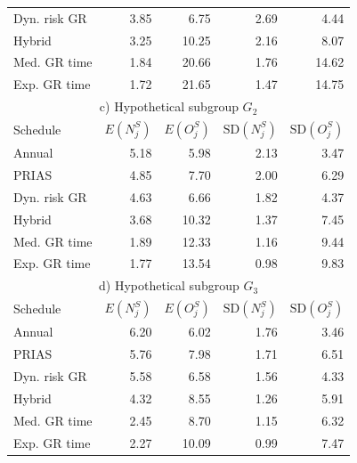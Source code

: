 \begin{table}
\begin{tabular}{lrrrr}
    Dyn. risk GR       & 3.85            & 6.75                & 2.69          & 4.44              \\
    Hybrid       & 3.25            & 10.25               & 2.16          & 8.07              \\
    Med. GR time & 1.84            & 20.66               & 1.76          & 14.62             \\
    Exp. GR time & 1.72            & 21.65               & 1.47          & 14.75             \\
    \hline      
    \multicolumn{5}{c}{c) Hypothetical subgroup $G_2$}\\
    \hline
    Schedule        & $E(N^S_j)$ & $E(O^S_j)$ & ${\mbox{SD}(N^S_j)}$ & ${\mbox{SD}(O^S_j)}$ \\
    \hline
    Annual         & 5.18            & 5.98                & 2.13          & 3.47              \\
    PRIAS          & 4.85            & 7.70                & 2.00          & 6.29        \\
    Dyn. risk GR       & 4.63            & 6.66                & 1.82          & 4.37              \\
    Hybrid       & 3.68            & 10.32                & 1.37          & 7.45              \\
    Med. GR time & 1.89             & 12.33               & 1.16          & 9.44              \\
    Exp. GR time & 1.77            & 13.54               & 0.98          & 9.83              \\
    \hline      
    \multicolumn{5}{c}{d) Hypothetical subgroup $G_3$}\\
    \hline
    Schedule        & $E(N^S_j)$ & $E(O^S_j)$ & ${\mbox{SD}(N^S_j)}$ & ${\mbox{SD}(O^S_j)}$ \\
    \hline
    Annual         & 6.20             & 6.02                & 1.76          & 3.46              \\
    PRIAS          & 5.76             & 7.98                & 1.71         & 6.51        \\
    Dyn. risk GR       & 5.58            & 6.58                & 1.56          & 4.33              \\
    Hybrid       & 4.32            & 8.55                & 1.26          & 5.91              \\
    Med. GR time & 2.45            & 8.70                & 1.15          & 6.32              \\
    Exp. GR time & 2.27            & 10.09               & 0.99          & 7.47              \\
    \hline     
    \end{tabular}
    \end{table}

